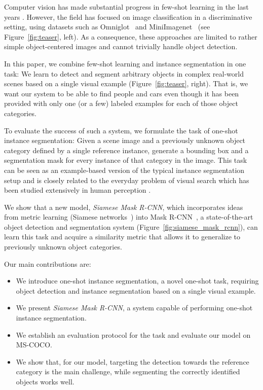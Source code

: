 \documentclass{article}
\newcommand{\coco}{MS-COCO\xspace}
\begin{document}
Computer vision has made substantial progress in few-shot learning in the last years \cite{Lake2015, Snell2017, Finn2017, Rusu2018, Liu2019}. However, the field has focused on image classification in a discriminative setting, using datasets such as Omniglot~\cite{Lake2015} and MiniImagenet~\cite{Vinyals2016} (see Figure~\ref{fig:teaser}, left). As a consequence, these approaches are limited to rather simple object-centered images and cannot trivially handle object detection.

In this paper, we combine few-shot learning and instance segmentation in one task: We learn to detect and segment arbitrary objects in complex real-world scenes based on a single visual example (Figure~\ref{fig:teaser}, right). That is, we want our system to be able to find people and cars even though it has been provided with only one (or a few) labeled examples for each of those object categories. 

To evaluate the success of such a system, we formulate the task of one-shot instance segmentation: Given a scene image and a previously unknown object category defined by a single reference instance, generate a bounding box and a segmentation mask for every instance of that category in the image. 
This task can be seen as an example-based version of the typical instance segmentation setup and is closely related to the everyday problem of visual search which has been studied extensively in human perception \cite{Sanders1996, Wolfe2011}.

We show that a new model, \emph{Siamese Mask R-CNN}, which incorporates ideas from metric learning (Siamese networks~\cite{Koch2015}) into Mask R-CNN~\cite{He2017}, a state-of-the-art object detection and segmentation system (Figure~\ref{fig:siamese_mask_rcnn}), can learn this task and acquire a similarity metric that allows it to generalize to previously unknown object categories.

Our main contributions are:
\begin{itemize}[nosep]
    \item We introduce one-shot instance segmentation, a novel one-shot task, requiring object detection and instance segmentation based on a single visual example.
    \item We present \emph{Siamese Mask R-CNN}, a system capable of performing one-shot instance segmentation.
    \item We establish an evaluation protocol for the task and evaluate our model on \coco.
    \item We show that, for our model, targeting the detection towards the reference category is the main challenge, while segmenting the correctly identified objects works well.
\end{itemize}
\end{document}
